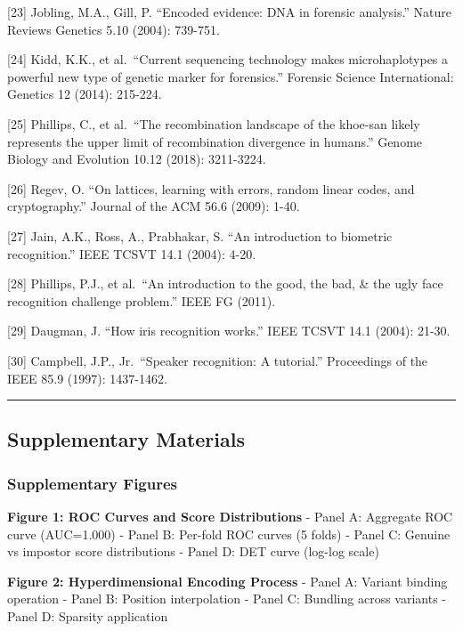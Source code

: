 \documentclass[
  11pt,
]{article}
\begin{document}
{[}23{]} Jobling, M.A., Gill, P. ``Encoded evidence: DNA in forensic
analysis.'' Nature Reviews Genetics 5.10 (2004): 739-751.

{[}24{]} Kidd, K.K., et al.~``Current sequencing technology makes
microhaplotypes a powerful new type of genetic marker for forensics.''
Forensic Science International: Genetics 12 (2014): 215-224.

{[}25{]} Phillips, C., et al.~``The recombination landscape of the
khoe-san likely represents the upper limit of recombination divergence
in humans.'' Genome Biology and Evolution 10.12 (2018): 3211-3224.

{[}26{]} Regev, O. ``On lattices, learning with errors, random linear
codes, and cryptography.'' Journal of the ACM 56.6 (2009): 1-40.

{[}27{]} Jain, A.K., Ross, A., Prabhakar, S. ``An introduction to
biometric recognition.'' IEEE TCSVT 14.1 (2004): 4-20.

{[}28{]} Phillips, P.J., et al.~``An introduction to the good, the bad,
\& the ugly face recognition challenge problem.'' IEEE FG (2011).

{[}29{]} Daugman, J. ``How iris recognition works.'' IEEE TCSVT 14.1
(2004): 21-30.

{[}30{]} Campbell, J.P., Jr.~``Speaker recognition: A tutorial.''
Proceedings of the IEEE 85.9 (1997): 1437-1462.

\begin{center}\rule{0.5\linewidth}{0.5pt}\end{center}

\subsection{Supplementary Materials}\label{supplementary-materials}

\subsubsection{Supplementary Figures}\label{supplementary-figures}

\textbf{Figure 1: ROC Curves and Score Distributions} - Panel A:
Aggregate ROC curve (AUC=1.000) - Panel B: Per-fold ROC curves (5 folds)
- Panel C: Genuine vs impostor score distributions - Panel D: DET curve
(log-log scale)

\textbf{Figure 2: Hyperdimensional Encoding Process} - Panel A: Variant
binding operation - Panel B: Position interpolation - Panel C: Bundling
across variants - Panel D: Sparsity application
\end{document}
